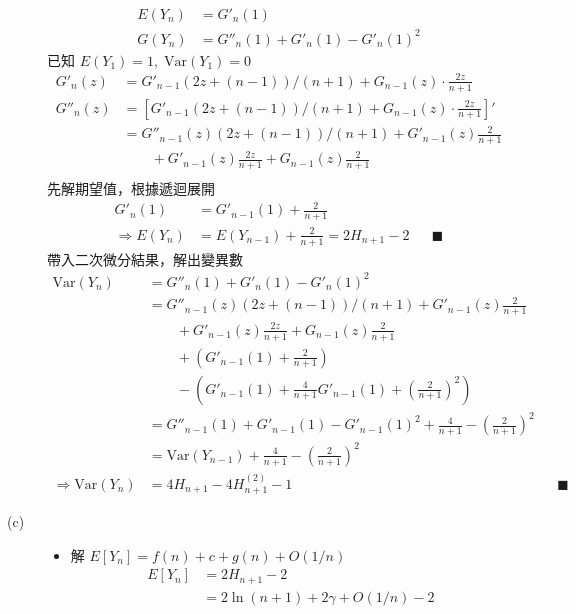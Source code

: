 \documentclass[11pt,fleqn]{article}
\begin{document}
\begin{description}
\begin{align*}
			E(Y_n) &= {G}'_n(1) \\
			G(Y_n) &= {G}''_n(1) + {G}'_n(1) - {G}'_n(1)^2
		\end{align*}
		已知 $E(Y_1) = 1, \; \text{Var}(Y_1) = 0$
		\begin{align*}
			{G}'_n(z) &= {G}'_{n-1} (2z + (n-1)) / (n+1) + G_{n-1}(z) \cdot \frac{2z}{n+1} \\
			{G}''_n(z) &= \left[ {G}'_{n-1} (2z + (n-1)) / (n+1) + G_{n-1}(z) \cdot \frac{2z}{n+1} \right]' \\
				&= {G}''_{n-1}(z)(2z + (n-1)) / (n+1) + {G}'_{n-1}(z) \frac{2}{n+1} \\
				& \qquad + {G}'_{n-1}(z)\frac{2z}{n+1} + G_{n-1}(z) \frac{2}{n+1} \\
		\end{align*}
		先解期望值，根據遞迴展開
		\begin{align*}
			{G}'_n(1) &= {G}'_{n-1}(1) + \frac{2}{n+1} \\
			\Rightarrow
				E(Y_n) &= E(Y_{n-1}) + \frac{2}{n+1} = 2 H_{n+1} - 2 && \blacksquare
		\end{align*}
		帶入二次微分結果，解出變異數
		\begin{align*}
			\text{Var}(Y_n) &= {G}''_n(1) + {G}'_n(1) - {G}'_n(1)^2 \\
			&= {G}''_{n-1}(z)(2z + (n-1)) / (n+1) + {G}'_{n-1}(z) \frac{2}{n+1} \\
			& \qquad + {G}'_{n-1}(z)\frac{2z}{n+1} + G_{n-1}(z) \frac{2}{n+1} \\
			& \qquad + \left( {G}'_{n-1}(1) + \frac{2}{n+1} \right)\\
			& \qquad - \left( {G}'_{n-1}(1) + \frac{4}{n+1} {G}'_{n-1}(1) + \left(\frac{2}{n+1}\right)^2 \right) \\
			&= {G}''_{n-1}(1) + {G}'_{n-1}(1) - {G}'_{n-1}(1)^2 + \frac{4}{n+1} - \left(\frac{2}{n+1}\right)^2 \\
			&= \text{Var}(Y_{n-1}) + \frac{4}{n+1} - \left(\frac{2}{n+1}\right)^2 \\
			\Rightarrow
				\text{Var}(Y_n) &= 4 H_{n+1} - 4 H^{(2)}_{n+1} - 1 && \blacksquare
		\end{align*}
	\item[(c)] 
		\begin{itemize}
			\item 解 $E[Y_n] = f(n) + c + g(n) + O(1/n)$
			\begin{align*}
				E[Y_n] 
				&= 2 H_{n+1} - 2 \\
				&= 2 \ln (n+1) + 2 \gamma + O(1/n) - 2
			\end{align*}

\end{itemize}
\end{description}
\end{document}
